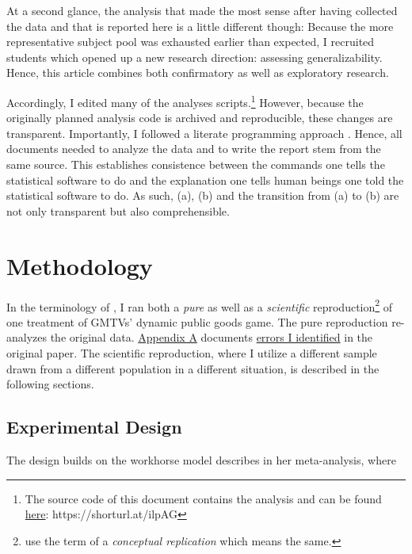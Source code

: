\documentclass[
  authoryear,
  review,
  3p,
  onecolumn]{elsarticle}
\begin{document}
At a second glance, the analysis that made the most sense after having
collected the data and that is reported here is a little different
though: Because the more representative subject pool was exhausted
earlier than expected, I recruited students which opened up a new
research direction: assessing generalizability. Hence, this article
combines both confirmatory as well as exploratory research.

Accordingly, I edited many of the analyses scripts.\footnote{The source
  code of this document contains the analysis and can be found
  \href{https://github.com/Howquez/coopUncertainty/blob/main/analysis/quarto/paper.qmd}{here}:
  https://shorturl.at/ilpAG} However, because the originally planned
analysis code is archived and reproducible, these changes are
transparent. Importantly, I followed a literate programming approach
\citep{Knuth_1984, AkhtarYe_2023}. Hence, all documents needed to
analyze the data and to write the report stem from the same source. This
establishes consistence between the commands one tells the statistical
software to do and the explanation one tells human beings one told the
statistical software to do. As such, (a), (b) and the transition from
(a) to (b) are not only transparent but also comprehensible.

\hypertarget{sec-methods}{%
\section{Methodology}\label{sec-methods}}

In the terminology of \citet{Hamermesh2007}, I ran both a \emph{pure} as
well as a \emph{scientific} reproduction\footnote{\citet{Parsons2022}
  use the term of a \emph{conceptual replication} which means the same.}
of one treatment of GMTVs' dynamic public goods game. The pure
reproduction re-analyzes the original data.
\protect\hyperlink{A:-Pure-Replication}{Appendix A} documents
\href{}{errors I identified} in the original paper. The scientific
reproduction, where I utilize a different sample drawn from a different
population in a different situation, is described in the following
sections.

\hypertarget{sec-design}{%
\subsection{Experimental Design}\label{sec-design}}

The design builds on the workhorse model \citet[p.301]{Zelmer2003}
describes in her meta-analysis, where
\end{document}
